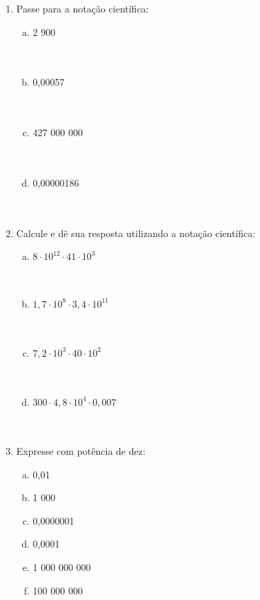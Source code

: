 \documentclass[a4paper,14pt]{article}
\begin{document}
\begin{multicols}{2}
\begin{enumerate}
\begin{enumerate}[a)]
			\end{enumerate}
			\item Passe para a notação científica:
			\begin{enumerate}[a)]
				\item 2 900 \\\\\\
				\item 0,00057 \\\\\\
				\item 427 000 000 \\\\\\
				\item 0,00000186 \\\\\\
			\end{enumerate}
			\item Calcule e dê sua resposta utilizando a notação científica:
			\begin{enumerate}[a)]
				\item $8 \cdot 10^{12} \cdot 41 \cdot 10^3$ \\\\\\
				\item $1,7 \cdot 10^8 \cdot 3,4 \cdot 10^{11}$ \\\\\\
				\item $7,2 \cdot 10^3 \cdot 40 \cdot 10^2$ \\\\\\
				\item $300 \cdot 4,8 \cdot 10^4 \cdot 0,007$ \\\\\\
			\end{enumerate}
			\item Expresse com potência de dez:
			\begin{enumerate}[a)]
				\item 0,01
				\item 1 000
				\item 0,0000001
				\item 0,0001
				\item 1 000 000 000
				\item 100 000 000

\end{enumerate}
\end{enumerate}
\end{multicols}
\end{document}
